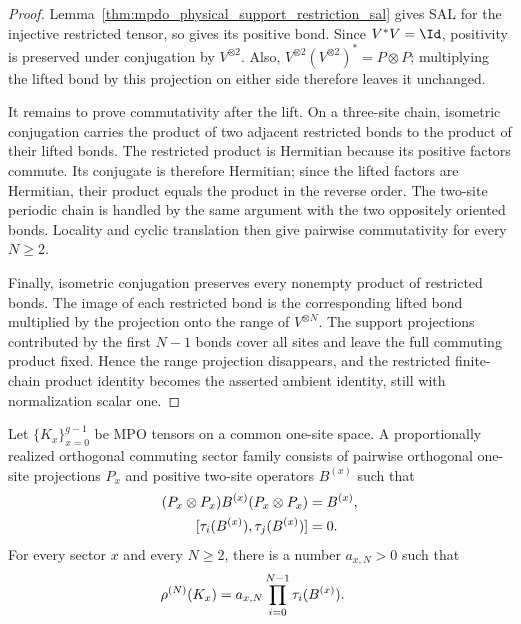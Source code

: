 \begin{proof}\leanok
    Lemma~\ref{thm:mpdo_physical_support_restriction_sal} gives SAL for the
    injective restricted tensor, so
    \cite[Proposition~C.8]{Cirac2016MPDO_arXiv} gives its positive bond. Since
    $V^*V=\Id$, positivity is preserved under conjugation by $V^{\otimes 2}$. Also,
    $V^{\otimes 2}(V^{\otimes 2})^*=P\otimes P$; multiplying the lifted bond
    by this projection on either side therefore leaves it unchanged.

    It remains to prove commutativity after the lift. On a three-site chain,
    isometric conjugation carries the product of two adjacent restricted bonds
    to the product of their lifted bonds. The restricted product is Hermitian
    because its positive factors commute. Its conjugate is therefore
    Hermitian; since the lifted factors are Hermitian, their product equals
    the product in the reverse order. The two-site periodic chain is handled
    by the same argument with the two oppositely oriented bonds. Locality and
    cyclic translation then give pairwise commutativity for every $N\geq 2$.

    Finally, isometric conjugation preserves every nonempty product of
    restricted bonds. The image of each restricted bond is the corresponding
    lifted bond multiplied by the projection onto the range of
    $V^{\otimes N}$. The support projections contributed by the first
    $N-1$ bonds cover all sites and leave the full commuting product fixed.
    Hence the range projection disappears, and the restricted finite-chain
    product identity becomes the asserted ambient identity, still with
    normalization scalar one.
\end{proof}

\begin{definition}
    \label{def:mpdo_proportional_orthogonal_commuting_sector_family}
    \leanok
    Let $\{K_x\}_{x=0}^{g-1}$ be MPO tensors on a common one-site space.
    A proportionally realized orthogonal commuting sector family consists of
    pairwise orthogonal one-site projections $P_x$ and positive two-site
    operators $B^{(x)}$ such that
    \begin{align}
        (P_x\otimes P_x)B^{(x)}(P_x\otimes P_x)
         & =B^{(x)},
        \notag       \\
        [\tau_i(B^{(x)}),\tau_j(B^{(x)})]
         & =0.
        \notag
    \end{align}
    For every sector $x$ and every $N\geq2$, there is a number
    $a_{x,N}>0$ such that
    \begin{align}
        \rho^{(N)}(K_x)
         & =a_{x,N}\prod_{i=0}^{N-1}\tau_i(B^{(x)}).
        \notag
    \end{align}
\end{definition}

